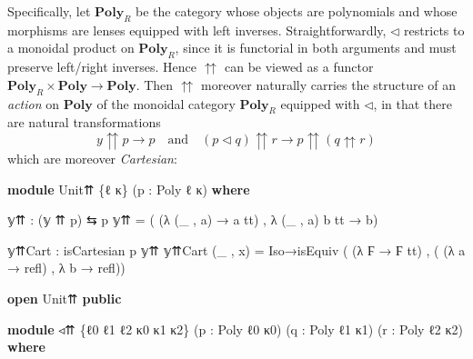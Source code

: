 \documentclass[
  11pt,
  oneside,
  article]{memoir}
\newenvironment{Shaded}{}{}
\newcommand{\KeywordTok}[1]{\textcolor[rgb]{0.00,0.44,0.13}{\textbf{#1}}}
\newcommand{\NormalTok}[1]{#1}
\newcommand{\OtherTok}[1]{\textcolor[rgb]{0.00,0.44,0.13}{#1}}
\theoremstyle{definition}
\theoremstyle{plain}
\newcommand{\0}{\textsf{0}}
\newcommand{\1}{\tn{\textsf{1}}}
\begin{document}
Specifically, let \(\mathbf{Poly}_{R}\) be the category whose objects
are polynomials and whose morphisms are lenses equipped with left
inverses. Straightforwardly, \(\triangleleft\) restricts to a monoidal
product on \(\mathbf{Poly}_R\), since it is functorial in both arguments
and must preserve left/right inverses. Hence \(\upuparrows\) can be
viewed as a functor
\(\mathbf{Poly}_R \times \mathbf{Poly} \to \mathbf{Poly}\). Then
\(\upuparrows\) moreover naturally carries the structure of an
\emph{action} on \(\mathbf{Poly}\) of the monoidal category
\(\mathbf{Poly}_R\) equipped with \(\triangleleft\), in that there are
natural transformations \[
y \upuparrows p \to p \quad \text{and} \quad
(p \triangleleft q) \upuparrows r \to p \upuparrows (q \upuparrows r)
\] which are moreover \emph{Cartesian}:

\begin{Shaded}
\begin{Highlighting}[]
\KeywordTok{module}\NormalTok{ Unit⇈ }\OtherTok{\{}\NormalTok{ℓ κ}\OtherTok{\}} \OtherTok{(}\NormalTok{p }\OtherTok{:}\NormalTok{ Poly ℓ κ}\OtherTok{)} \KeywordTok{where}

\NormalTok{    𝕪⇈ }\OtherTok{:} \OtherTok{(}\NormalTok{𝕪 ⇈ p}\OtherTok{)}\NormalTok{ ⇆ p}
\NormalTok{    𝕪⇈ }\OtherTok{=} \OtherTok{(} \OtherTok{(λ} \OtherTok{(\_}\NormalTok{ , a}\OtherTok{)} \OtherTok{→}\NormalTok{ a tt}\OtherTok{)}\NormalTok{ , }\OtherTok{λ} \OtherTok{(\_}\NormalTok{ , a}\OtherTok{)}\NormalTok{ b tt }\OtherTok{→}\NormalTok{ b}\OtherTok{)}

\NormalTok{    𝕪⇈Cart }\OtherTok{:}\NormalTok{ isCartesian p 𝕪⇈}
\NormalTok{    𝕪⇈Cart }\OtherTok{(\_}\NormalTok{ , x}\OtherTok{)} \OtherTok{=} 
\NormalTok{        Iso→isEquiv }\OtherTok{(} \OtherTok{(λ}\NormalTok{ Ϝ }\OtherTok{→}\NormalTok{ Ϝ tt}\OtherTok{)} 
\NormalTok{                    , }\OtherTok{(} \OtherTok{(λ}\NormalTok{ a }\OtherTok{→}\NormalTok{ refl}\OtherTok{)} 
\NormalTok{                      , }\OtherTok{λ}\NormalTok{ b }\OtherTok{→}\NormalTok{ refl}\OtherTok{))}

\KeywordTok{open}\NormalTok{ Unit⇈ }\KeywordTok{public}

\KeywordTok{module}\NormalTok{ ◃⇈ }\OtherTok{\{}\NormalTok{ℓ0 ℓ1 ℓ2 κ0 κ1 κ2}\OtherTok{\}} \OtherTok{(}\NormalTok{p }\OtherTok{:}\NormalTok{ Poly ℓ0 κ0}\OtherTok{)} 
          \OtherTok{(}\NormalTok{q }\OtherTok{:}\NormalTok{ Poly ℓ1 κ1}\OtherTok{)} \OtherTok{(}\NormalTok{r }\OtherTok{:}\NormalTok{ Poly ℓ2 κ2}\OtherTok{)} \KeywordTok{where}


\end{Highlighting}
\end{Shaded}
\end{document}
